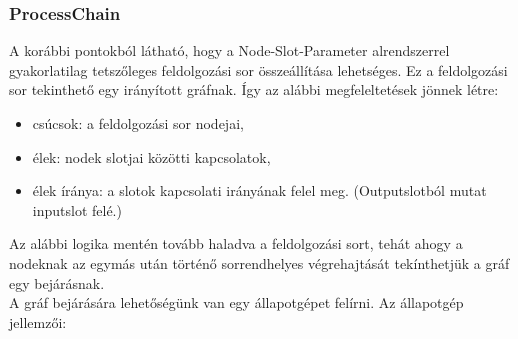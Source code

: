 \documentclass[a4paper,12pt,oneside]{report}
\begin{document}
\begin{landscape}
\begin{center}
\begin{figure}[h]
  \label{fig:bimg_dataflow}
\end{figure}
\end{center}
\end{landscape}

\subsubsection{ProcessChain}
A korábbi pontokból látható, hogy a Node-Slot-Parameter alrendszerrel gyakorlatilag tetszőleges feldolgozási sor összeállítása lehetséges. Ez a feldolgozási sor tekinthető egy irányított gráfnak. Így az alábbi megfeleltetések jönnek létre:
\begin{itemize}
	\itemsep0em
	\item csúcsok: a feldolgozási sor nodejai,
	\item élek: nodek slotjai közötti kapcsolatok,
	\item élek íránya: a slotok kapcsolati irányának felel meg. (Outputslotból mutat inputslot felé.)
\end{itemize}
Az alábbi logika mentén tovább haladva a feldolgozási sort, tehát ahogy a nodeknak az egymás után történő sorrendhelyes végrehajtását tekínthetjük a gráf egy bejárásnak.\\
A gráf bejárására lehetőségünk van egy állapotgépet felírni. Az állapotgép jellemzői:
\end{document}
